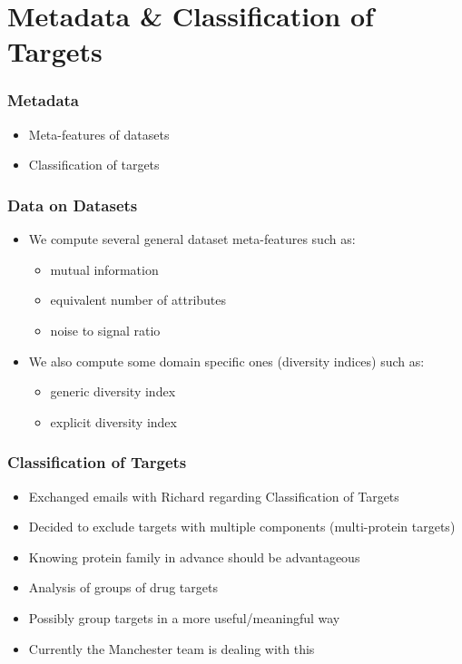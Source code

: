 \documentclass[compress]{beamer}
\begin{document}
\section{Metadata \& Classification of Targets}
\begin{frame}
\frametitle{Metadata} 
\begin{itemize}%
\item Meta-features of datasets
\item Classification of targets
\end{itemize}



\end{frame}

\begin{frame}
\frametitle{Data on Datasets} 
\begin{itemize}%
  \item We compute several general dataset meta-features such as:
  \begin{itemize}
  \item mutual information
  \item equivalent number of attributes
  \item noise to signal ratio
  \end{itemize}
  \item We also compute some domain specific ones (diversity indices) such as:
  \begin{itemize}
  \item generic diversity index
  \item explicit diversity index
  \end{itemize}
\end{itemize}
\end{frame}

\begin{frame}
\frametitle{Classification of Targets} 
\begin{itemize}%
  \item Exchanged emails with Richard regarding Classification of Targets
  \item Decided to exclude targets with multiple components (multi-protein targets)
  \item Knowing protein family in advance should be advantageous
  \item Analysis of groups of drug targets
  \item Possibly group targets in a more useful/meaningful way  
  \item Currently the Manchester team is dealing with this
\end{itemize}
\end{frame}
\end{document}
